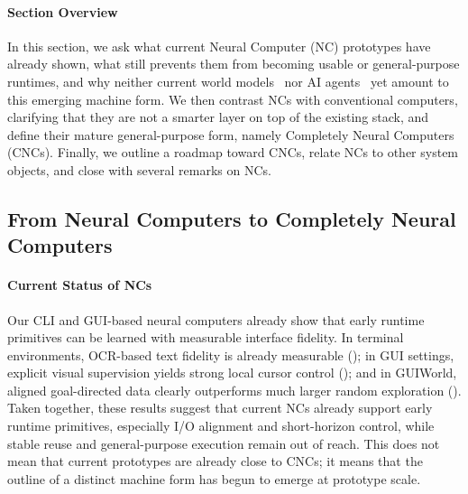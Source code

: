 
\paragraph{Section Overview}
In this section, we ask what current Neural Computer (NC) prototypes have already shown, what still prevents them from becoming usable or general-purpose runtimes, and why neither current world models~\citep{ha2018world,openai2024sora,polyak2024movie,deepmind_veo_2025} nor AI agents~\citep{hong2023metagpt,claudeComputerTool,zhuge2026ai} yet amount to this emerging machine form.
We then contrast NCs with conventional computers, clarifying that they are not a smarter layer on top of the existing stack, and define their mature general-purpose form, namely Completely Neural Computers (CNCs).
Finally, we outline a roadmap toward CNCs, relate NCs to other system objects, and close with several remarks on NCs.

\subsection{From Neural Computers to Completely Neural Computers}

\paragraph{Current Status of NCs}
Our CLI and GUI-based neural computers already show that early runtime primitives can be learned with measurable interface fidelity. In terminal environments, OCR-based text fidelity is already measurable (); in GUI settings, explicit visual supervision yields strong local cursor control (); and in GUIWorld, aligned goal-directed data clearly outperforms much larger random exploration (). Taken together, these results suggest that current NCs already support early runtime primitives, especially I/O alignment and short-horizon control, while stable reuse and general-purpose execution remain out of reach.
This does not mean that current prototypes are already close to CNCs; it means that the outline of a distinct machine form has begun to emerge at prototype scale.

